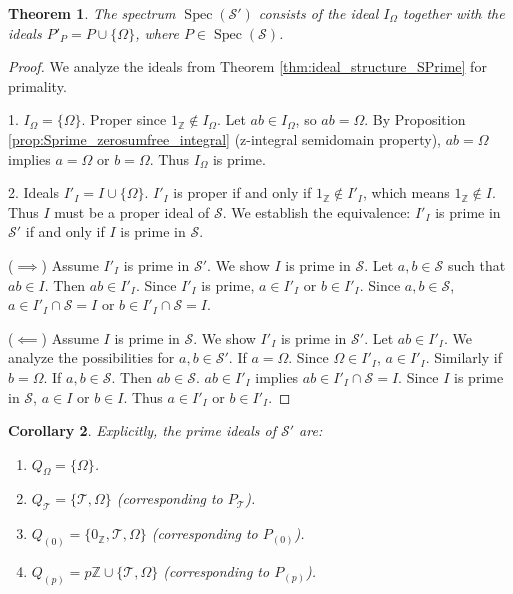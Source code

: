 \documentclass[11pt, a4paper]{article}
\theoremstyle{plain}
\newtheorem{theorem}{Theorem}[section]
\newtheorem{corollary}[theorem]{Corollary}
\theoremstyle{definition}
\numberwithin{equation}{section}
\newcommand{\Z}{\mathbb{Z}}
\newcommand{\Tobj}{\mathcal{T}} %
\newcommand{\OmegaObj}{\Omega} %
\newcommand{\SemiringS}{\mathcal{S}}
\newcommand{\SemiringSPrime}{\mathcal{S}'}
\DeclareMathOperator{\Spec}{Spec}
\begin{document}
\begin{theorem}\label{thm:prime_ideals_SPrime}
The spectrum $\Spec(\SemiringSPrime)$ consists of the ideal $I_{\OmegaObj}$ together with the ideals $P'_P = P \cup \{\OmegaObj\}$, where $P \in \Spec(\SemiringS)$.
\end{theorem}
\begin{proof}
We analyze the ideals from Theorem \ref{thm:ideal_structure_SPrime} for primality.

1. $I_{\OmegaObj}=\{\OmegaObj\}$. Proper since $1_{\Z} \notin I_{\OmegaObj}$. Let $ab \in I_{\OmegaObj}$, so $ab=\OmegaObj$.
By Proposition \ref{prop:Sprime_zerosumfree_integral} (z-integral semidomain property), $ab=\OmegaObj$ implies $a=\OmegaObj$ or $b=\OmegaObj$.
Thus $I_{\OmegaObj}$ is prime.

2. Ideals $I'_I = I \cup \{\OmegaObj\}$. $I'_I$ is proper if and only if $1_{\Z} \notin I'_I$, which means $1_{\Z} \notin I$. Thus $I$ must be a proper ideal of $\SemiringS$.
We establish the equivalence: $I'_I$ is prime in $\SemiringSPrime$ if and only if $I$ is prime in $\SemiringS$.

($\implies$) Assume $I'_I$ is prime in $\SemiringSPrime$. We show $I$ is prime in $\SemiringS$. Let $a, b \in \SemiringS$ such that $ab \in I$.
Then $ab \in I'_I$. Since $I'_I$ is prime, $a \in I'_I$ or $b \in I'_I$. Since $a, b \in \SemiringS$, $a \in I'_I \cap \SemiringS = I$ or $b \in I'_I \cap \SemiringS = I$.

($\impliedby$) Assume $I$ is prime in $\SemiringS$. We show $I'_I$ is prime in $\SemiringSPrime$. Let $ab \in I'_I$.
We analyze the possibilities for $a, b \in \SemiringSPrime$.
If $a=\OmegaObj$. Since $\OmegaObj \in I'_I$, $a \in I'_I$. Similarly if $b=\OmegaObj$.
If $a, b \in \SemiringS$. Then $ab \in \SemiringS$. $ab \in I'_I$ implies $ab \in I'_I \cap \SemiringS = I$.
Since $I$ is prime in $\SemiringS$, $a \in I$ or $b \in I$. Thus $a \in I'_I$ or $b \in I'_I$.
\end{proof}

\begin{corollary}\label{cor:explicit_primes_SPrime}
Explicitly, the prime ideals of $\SemiringSPrime$ are:
\begin{enumerate}
    \item $Q_{\OmegaObj} = \{\OmegaObj\}$.
    \item $Q_{\Tobj} = \{\Tobj, \OmegaObj\}$ (corresponding to $P_{\Tobj}$).
    \item $Q_{(0)} = \{0_{\Z}, \Tobj, \OmegaObj\}$ (corresponding to $P_{(0)}$).
    \item $Q_{(p)} = p\Z \cup \{\Tobj, \OmegaObj\}$ (corresponding to $P_{(p)}$).
\end{enumerate}
\end{corollary}
\end{document}
